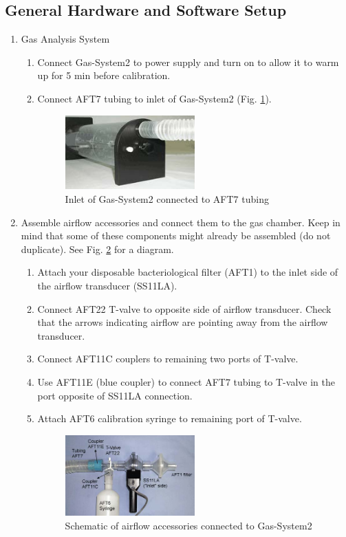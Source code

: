 \documentclass{article}
\begin{document}
\subsection*{General Hardware and Software Setup}
\begin{enumerate}
	\item Gas Analysis System\begin{enumerate}
	\item Connect Gas-System2 to power supply and turn on to allow it to warm up for 5 min before calibration.
	\item Connect AFT7 tubing to inlet of Gas-System2 (Fig. \ref{aft}).\begin{figure}[h]
	\centering\includegraphics[width=0.5\textwidth]{../images/BMR_2.jpg}
		\caption{Inlet of Gas-System2 connected to AFT7 tubing}
		\label{aft}
		\end{figure}
	\end{enumerate}
	
	\item Assemble airflow accessories and connect them to the gas chamber. Keep in mind that some of these components might already be assembled (do not duplicate). See Fig. \ref{aft2} for a diagram.\begin{enumerate}
	\item Attach your disposable bacteriological filter (AFT1) to the inlet side of the airflow transducer (SS11LA).
	\item Connect AFT22 T-valve to opposite side of airflow transducer. Check that the arrows indicating airflow are pointing away from the airflow transducer.
	\item Connect AFT11C couplers to remaining two ports of T-valve.
	\item Use AFT11E (blue coupler) to connect AFT7 tubing to T-valve in the port opposite of SS11LA connection.
	\item Attach AFT6 calibration syringe to remaining port of T-valve.\begin{figure}[h]
	\centering\includegraphics[width=0.5\textwidth]{../images/BMR_3.jpg}
		\caption{Schematic of airflow accessories connected to Gas-System2}
		\label{aft2}
		\end{figure}
	\end{enumerate}
	

\end{enumerate}
\end{document}
